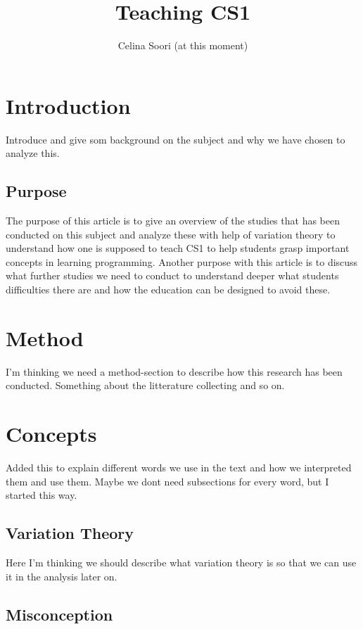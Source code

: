 \documentclass[twocolumn]{article}
\title{Teaching CS1}
\author{Celina Soori (at this moment)}
\begin{document}
\maketitle

\section{Introduction}

Introduce and give som background on the subject and why we have chosen to analyze this. 

\subsection{Purpose}

The purpose of this article is to give an overview of the studies that has been conducted on this subject and analyze these with help of variation theory to understand how one is supposed to teach CS1 to help students grasp important concepts in learning programming. Another purpose with this article is to discuss what further studies we need to conduct to understand deeper what students difficulties there are and how the education can be designed to avoid these. 

\section{Method}

I'm thinking we need a method-section to describe how this research has been conducted. Something about the litterature collecting and so on. 

\section{Concepts}

Added this to explain different words we use in the text and how we interpreted them and use them. Maybe we dont need subsections for every word, but I started this way.

\subsection{Variation Theory}

Here I'm thinking we should describe what variation theory is so that we can use it in the analysis later on.

\subsection{Misconception}
\end{document}
